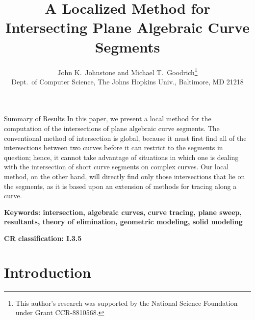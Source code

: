 
\DoubleSpace
\setlength{\oddsidemargin}{0pt}
\setlength{\evensidemargin}{0pt}
\setlength{\headsep}{0pt}
\setlength{\topmargin}{0pt}
\setlength{\textheight}{8.75in}
\setlength{\textwidth}{6.5in}
%
\title{A Localized Method for Intersecting Plane Algebraic Curve Segments}
\author{John K.\ Johnstone and Michael T.\ Goodrich\thanks{This 
	author's research was supported by
	the National Science Foundation under Grant CCR-8810568.}
	\\[5pt]
	Dept.\ of Computer Science, The Johns Hopkins Univ., Baltimore,
	MD 21218}
%

%
\maketitle
%
\begin{summary}{Summary of Results}
In this paper, we present a local method for the 
computation of the intersections of plane algebraic curve segments.
The conventional method of intersection is global, because it must first find all 
of the intersections between two curves before it can restrict to the segments in question;
hence, it cannot take advantage of situations in which one is dealing with the intersection of
short curve segments on complex curves.
Our local method, on the other hand, will directly find only those intersections that lie 
on the segments, as it is based upon an extension of methods for tracing along a curve.
\end{summary}

{\bf Keywords: intersection, algebraic curves, curve tracing, plane sweep, resultants,
	theory of elimination, geometric modeling, solid modeling}

{\bf CR classification: I.3.5}

\section{Introduction} 

